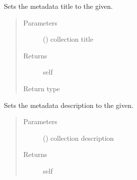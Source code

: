 \documentclass[letterpaper,10pt,english]{sphinxmanual}
\begin{document}
\begin{fulllineitems}
\begin{fulllineitems}
\label{\detokenize{autoapi/pine/client/models/index:pine.client.models.CollectionBuilder.title}}
Sets the metadata title to the given.
\begin{quote}\begin{description}
\item[{Parameters}] \leavevmode
{} () \textendash{} collection title

\item[{Returns}] \leavevmode
self

\item[{Return type}] \leavevmode
{\hyperref[\detokenize{autoapi/pine/client/models/index:pine.client.models.CollectionBuilder}]{}}

\end{description}\end{quote}

\end{fulllineitems}


\begin{fulllineitems}
\label{\detokenize{autoapi/pine/client/models/index:pine.client.models.CollectionBuilder.description}}
Sets the metadata description to the given.
\begin{quote}\begin{description}
\item[{Parameters}] \leavevmode
{} () \textendash{} collection description

\item[{Returns}] \leavevmode
self


\end{description}
\end{quote}
\end{fulllineitems}
\end{fulllineitems}
\end{document}
